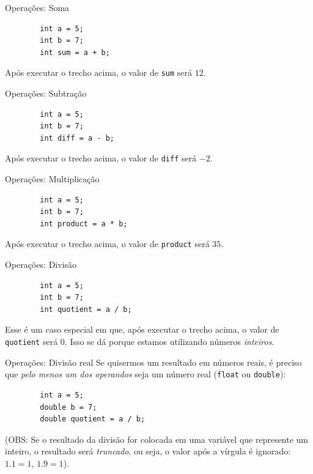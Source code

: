\documentclass{beamer}
\begin{document}
\begin{frame}[fragile]{Operações: Soma}
    \begin{verbatim}
        int a = 5;
        int b = 7;
        int sum = a + b;
    \end{verbatim}

    Após executar o trecho acima, o valor de \texttt{sum} será $12$.
\end{frame}

\begin{frame}[fragile]{Operações: Subtração}
    \begin{verbatim}
        int a = 5;
        int b = 7;
        int diff = a - b;
    \end{verbatim}

    Após executar o trecho acima, o valor de \texttt{diff} será $-2$.
\end{frame}

\begin{frame}[fragile]{Operações: Multiplicação}
    \begin{verbatim}
        int a = 5;
        int b = 7;
        int product = a * b;
    \end{verbatim}

    Após executar o trecho acima, o valor de \texttt{product} será $35$.
\end{frame}

\begin{frame}[fragile]{Operações: Divisão}
    \begin{verbatim}
        int a = 5;
        int b = 7;
        int quotient = a / b;
    \end{verbatim}

    Esse é um caso especial em que, após executar o trecho acima, o valor de
    \texttt{quotient} será $0$. Isso se dá porque estamos utilizando números
    \emph{inteiros}.
\end{frame}

\begin{frame}[fragile]{Operações: Divisão real}
    Se quisermos um resultado em números reais, é preciso que \emph{pelo menos
    um dos operandos} seja um número real (\texttt{float} ou \texttt{double}):

    \begin{verbatim}
        int a = 5;
        double b = 7;
        double quotient = a / b;
    \end{verbatim}

    (OBS: Se o resultado da divisão for colocada em uma variável que represente
    um inteiro, o resultado será \emph{truncado}, ou seja, o valor após a
    vírgula é ignorado: $1.1 = 1$, $1.9 = 1$).
\end{frame}
\end{document}
